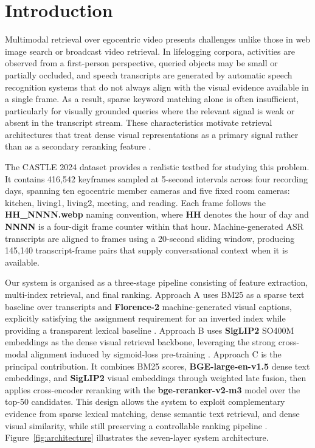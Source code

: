 \section{Introduction}
\label{sec:introduction}

Multimodal retrieval over egocentric video presents challenges unlike those in web image search or broadcast video retrieval. In lifelogging corpora, activities are observed from a first-person perspective, queried objects may be small or partially occluded, and speech transcripts are generated by automatic speech recognition systems that do not always align with the visual evidence available in a single frame. As a result, sparse keyword matching alone is often insufficient, particularly for visually grounded queries where the relevant signal is weak or absent in the transcript stream. These characteristics motivate retrieval architectures that treat dense visual representations as a primary signal rather than as a secondary reranking feature \cite{gurrin2024castle}.

The CASTLE 2024 dataset provides a realistic testbed for studying this problem. It contains 416,542 keyframes sampled at 5-second intervals across four recording days, spanning ten egocentric member cameras and five fixed room cameras: kitchen, living1, living2, meeting, and reading. Each frame follows the \textbf{HH\_NNNN.webp} naming convention, where \textbf{HH} denotes the hour of day and \textbf{NNNN} is a four-digit frame counter within that hour. Machine-generated ASR transcripts are aligned to frames using a 20-second sliding window, producing 145,140 transcript-frame pairs that supply conversational context when it is available.

Our system is organised as a three-stage pipeline consisting of feature extraction, multi-index retrieval, and final ranking. Approach A uses BM25 as a sparse text baseline over transcripts and \textbf{Florence-2} machine-generated visual captions, explicitly satisfying the assignment requirement for an inverted index while providing a transparent lexical baseline \cite{robertson2009probabilistic}. Approach B uses \textbf{SigLIP2} SO400M embeddings as the dense visual retrieval backbone, leveraging the strong cross-modal alignment induced by sigmoid-loss pre-training \cite{zhai2023sigmoid}. Approach C is the principal contribution. It combines BM25 scores, \textbf{BGE-large-en-v1.5} dense text embeddings, and \textbf{SigLIP2} visual embeddings through weighted late fusion, then applies cross-encoder reranking with the \textbf{bge-reranker-v2-m3} model over the top-50 candidates. This design allows the system to exploit complementary evidence from sparse lexical matching, dense semantic text retrieval, and dense visual similarity, while still preserving a controllable ranking pipeline \cite{chen2024bge}. Figure~\ref{fig:architecture} illustrates the seven-layer system architecture.

